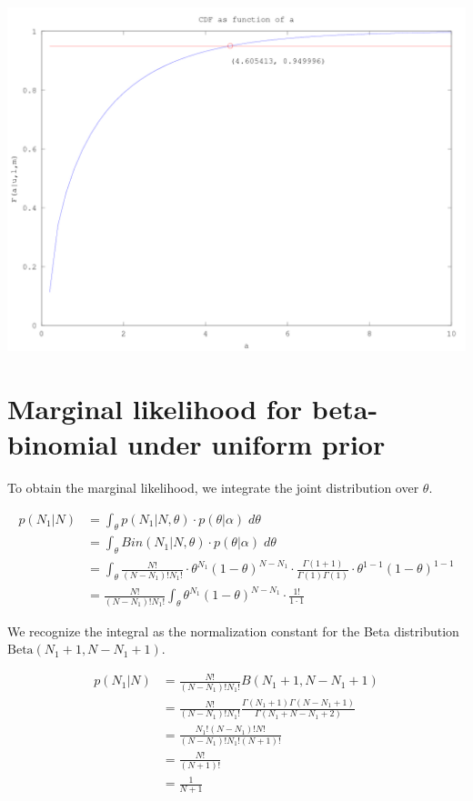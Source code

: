 \documentclass{article}
\begin{document}
\includegraphics[scale=.5]{fig3_16}

\section{Marginal likelihood for beta-binomial under uniform prior}

To obtain the marginal likelihood, we integrate the joint distribution over $\theta$.

\begin{align*}
  p(N_1|N) &= \int_\theta p(N_1|N, \theta) \cdot p(\theta|\alpha) \; d\theta \\
           &= \int_\theta Bin(N_1|N, \theta) \cdot p(\theta|\alpha) \; d\theta \\
           &= \int_\theta \frac{N!}{(N-N_1)!N_1!} \cdot \theta^{N_1}(1
             - \theta)^{N - N_1} \cdot \frac{\Gamma(1 +
             1)}{\Gamma(1)\Gamma(1)} \cdot \theta^{1 - 1} (1 - \theta)^{1 -
             1} \\
           &= \frac{N!}{(N-N_1)!N_1!} \int_\theta \theta^{N_1}(1
             - \theta)^{N - N_1} \cdot \frac{1!}{1 \cdot 1}
\end{align*}

We recognize the integral as the normalization constant for the Beta
distribution $\text{Beta}(N_1 + 1, N - N_1 + 1)$.

\begin{align*}
           p(N_1|N) &= \frac{N!}{(N-N_1)!N_1!} B(N_1 + 1, N - N_1
                      + 1) \\
                    &= \frac{N!}{(N-N_1)!N_1!} \frac{\Gamma(N_1 +
                      1)\Gamma(N-N_1+1)}{\Gamma(N_1+N-N_1+2)} \\
                    &= \frac{N_1!(N-N_1)!N!}{(N-N_1)!N_1!(N+1)!} \\
                    &= \frac{N!}{(N+1)!} \\
                    &= \frac{1}{N+1}
\end{align*}
\end{document}
